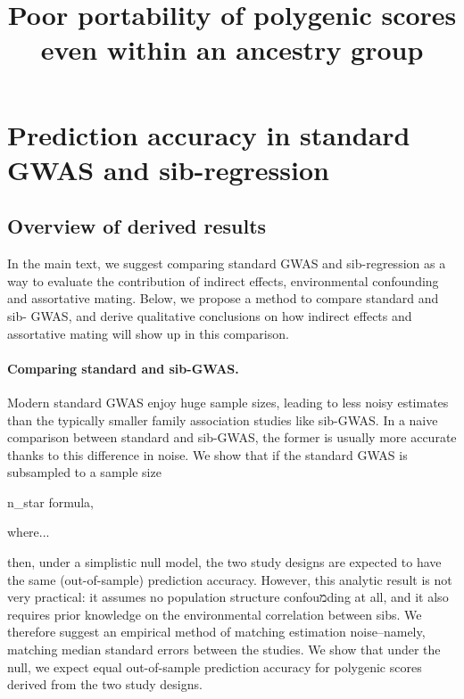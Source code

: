 \documentclass[hidelinks, 12pt]{article}
\title{Poor portability of polygenic scores even within an ancestry group}
\newcommand{\beginsupplement}{%
    \setcounter{table}{0}
    \renewcommand{\thetable}{S\arabic{table}}%
    \setcounter{figure}{0}
    \renewcommand{\thefigure}{S\arabic{figure}}%
}
\begin{document}
 
\baselineskip24pt

\maketitle 
\begin{center}
\end{center}
\clearpage

\begingroup
  \hypersetup{hidelinks}
  \tableofcontents
\endgroup

\listoffigures
\listoftables

\pagebreak

\beginsupplement

\section{Prediction accuracy in standard GWAS and sib-regression}
\subsection{Overview of derived results}
In the main text, we suggest comparing standard GWAS and sib-regression as a way to evaluate the contribution of indirect effects, environmental confounding and assortative mating.  Below, we propose a method to compare standard and sib- GWAS, and derive qualitative conclusions on how indirect effects and assortative mating will show up in this comparison.  

\paragraph{Comparing standard and sib-GWAS.} Modern standard GWAS enjoy huge sample sizes, leading to less noisy estimates than the typically smaller family association studies like sib-GWAS.  In a naive comparison between standard and sib-GWAS, the former is usually more accurate thanks to this difference in noise.  We show that if the standard GWAS is subsampled to a sample size 

n_star formula,

where... 

then, under a simplistic null model, the two study designs are expected to have the same (out-of-sample) prediction accuracy.  However, this analytic result is not very practical: it assumes no population structure confouמding at all, and it also requires prior knowledge on the environmental correlation between sibs.  We therefore suggest an empirical method of matching estimation noise--namely, matching median standard errors between the studies.  We show that under the null, we expect equal out-of-sample prediction accuracy for polygenic scores derived from the two study designs.  
\end{document}
